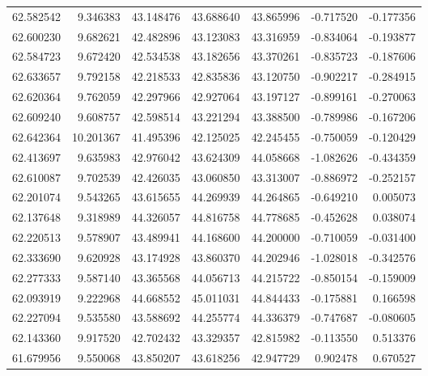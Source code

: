 \begin{tabular}{rrrrrrr}
 62.582542 &   9.346383 &         43.148476 &         43.688640 &         43.865996 & -0.717520 & -0.177356 \\
 62.600230 &   9.682621 &         42.482896 &         43.123083 &         43.316959 & -0.834064 & -0.193877 \\
 62.584723 &   9.672420 &         42.534538 &         43.182656 &         43.370261 & -0.835723 & -0.187606 \\
 62.633657 &   9.792158 &         42.218533 &         42.835836 &         43.120750 & -0.902217 & -0.284915 \\
 62.620364 &   9.762059 &         42.297966 &         42.927064 &         43.197127 & -0.899161 & -0.270063 \\
 62.609240 &   9.608757 &         42.598514 &         43.221294 &         43.388500 & -0.789986 & -0.167206 \\
 62.642364 &  10.201367 &         41.495396 &         42.125025 &         42.245455 & -0.750059 & -0.120429 \\
 62.413697 &   9.635983 &         42.976042 &         43.624309 &         44.058668 & -1.082626 & -0.434359 \\
 62.610087 &   9.702539 &         42.426035 &         43.060850 &         43.313007 & -0.886972 & -0.252157 \\
 62.201074 &   9.543265 &         43.615655 &         44.269939 &         44.264865 & -0.649210 &  0.005073 \\
 62.137648 &   9.318989 &         44.326057 &         44.816758 &         44.778685 & -0.452628 &  0.038074 \\
 62.220513 &   9.578907 &         43.489941 &         44.168600 &         44.200000 & -0.710059 & -0.031400 \\
 62.333690 &   9.620928 &         43.174928 &         43.860370 &         44.202946 & -1.028018 & -0.342576 \\
 62.277333 &   9.587140 &         43.365568 &         44.056713 &         44.215722 & -0.850154 & -0.159009 \\
 62.093919 &   9.222968 &         44.668552 &         45.011031 &         44.844433 & -0.175881 &  0.166598 \\
 62.227094 &   9.535580 &         43.588692 &         44.255774 &         44.336379 & -0.747687 & -0.080605 \\
 62.143360 &   9.917520 &         42.702432 &         43.329357 &         42.815982 & -0.113550 &  0.513376 \\
 61.679956 &   9.550068 &         43.850207 &         43.618256 &         42.947729 &  0.902478 &  0.670527 \\

\end{tabular}
